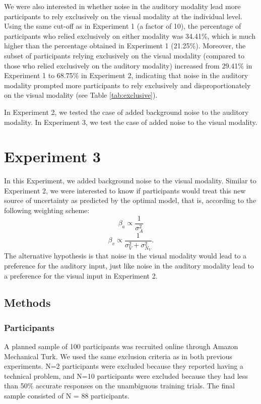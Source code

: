 \documentclass[english,,man,floatsintext]{apa6}
\theoremstyle{definition}
\theoremstyle{definition}
\theoremstyle{definition}
\theoremstyle{remark}
\begin{document}
We were also interested in whether noise in the auditory modality lead
more participants to rely exclusively on the visual modality at the
individual level. Using the same cut-off as in Experiment 1 (a factor of
10), the percentage of participants who relied exclusively on either
modality was 34.41\%, which is much higher than the percentage obtained
in Experiment 1 (21.25\%). Moreover, the subset of participants relying
exclusively on the visual modality (compared to those who relied
exclusively on the auditory modality) increased from 29.41\% in
Experiment 1 to 68.75\% in Experiment 2, indicating that noise in the
auditory modality prompted more participants to rely exclusively and
disproportionately on the visual modality (see Table
\ref{tab:exclusive}).

In Experiment 2, we tested the case of added background noise to the
auditory modality. In Experiment 3, we test the case of added noise to
the visual modality.

\section{Experiment 3}\label{experiment-3}

In this Experiment, we added background noise to the visual modality.
Similar to Experiment 2, we were interested to know if participants
would treat this new source of uncertainty as predicted by the optimal
model, that is, according to the following weighting scheme:
\[\beta_a \propto \frac{1}{\sigma^2_{A}}\]
\[\beta_v \propto \frac{1}{\sigma^2_{V}+\sigma^2_{N_V}}.\] The
alternative hypothesis is that noise in the visual modality would lead
to a preference for the auditory input, just like noise in the auditory
modality lead to a preference for the visual input in Experiment 2.

\subsection{Methods}\label{methods-2}

\subsubsection{Participants}\label{participants-3}

A planned sample of 100 participants was recruited online through Amazon
Mechanical Turk. We used the same exclusion criteria as in both previous
experiments. N=2 participants were excluded because they reported having
a technical problem, and N=10 participants were excluded because they
had less than 50\% accurate responses on the unambiguous training
trials. The final sample consisted of N = 88 participants.
\end{document}
